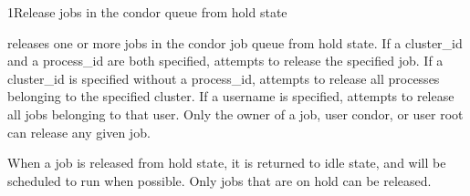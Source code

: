 \begin{ManPage}{}{1}{Release jobs in the condor queue from hold state}
\label{man-condor-release}
\Synopsis {}

\Description

 releases one or more jobs in the condor job queue from hold state.  If a
cluster\_id and a process\_id are both specified,  attempts to
release the specified job. If a cluster\_id is specified
without a process\_id,  attempts to release all processes belonging
to the specified cluster. If a username is specified,  attempts to
release all jobs belonging to that user. Only the owner of a job, user condor,
or user root can release any given job.

When a job is released from hold state, it is returned to idle state, and will be scheduled
to run when possible. Only jobs that are on hold can be released.

\begin{Options}
\end{Options}

\end{ManPage}
